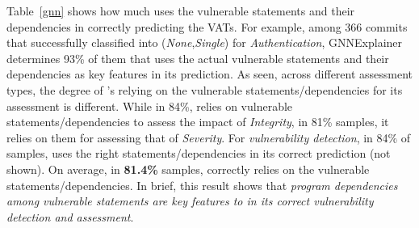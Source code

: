 %



Table~\ref{gnn} shows how much {\tool} uses the vulnerable
statements and their dependencies in correctly predicting the
VATs. For example, among 366 commits that {\tool} successfully
classified into ({\em None},{\em Single}) for {\em Authentication},
GNNExplainer determines 93\% of them that {\tool}
uses the actual vulnerable statements and their dependencies as key
features in its prediction.
As seen, across different assessment types, the degree of {\tool}'s
relying on the vulnerable statements/dependencies for its assessment
is different.  While in 84\%, {\tool} relies on vulnerable
statements/dependencies to assess the impact of {\em Integrity}, in
81\% samples, it relies on them for assessing that of {\em Severity}.
For {\em vulnerability detection}, in 84\% of samples, {\tool} uses
the right statements/dependencies in its correct prediction (not
shown).
%
On average, in {\bf 81.4\%} samples, {\tool} correctly
relies on the vulnerable statements/dependencies.
In brief, this result shows that {\em program dependencies among
vulnerable statements are key features to {\tool} in its correct
vulnerability detection and assessment}.



